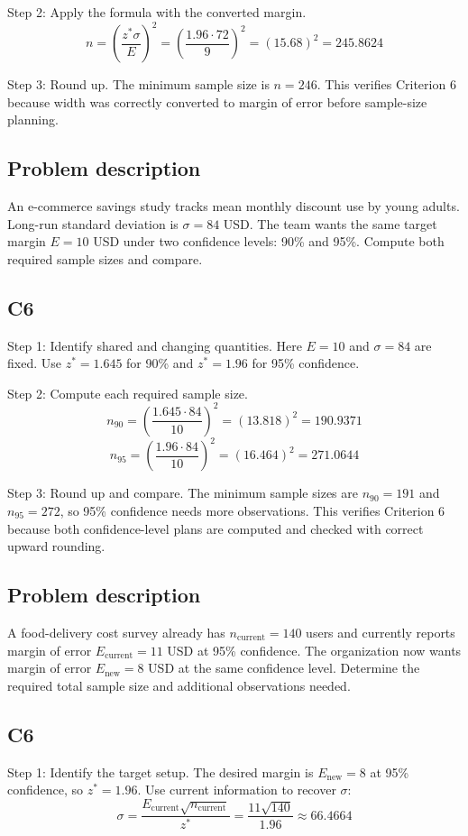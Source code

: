 \begin{ExamProblems}
		Step 2: Apply the formula with the converted margin.
		\[
		n = \left(\frac{z^*\sigma}{E}\right)^2
		= \left(\frac{1.96 \cdot 72}{9}\right)^2
		= \left(15.68\right)^2
		= 245.8624
		\]

		Step 3: Round up. The minimum sample size is $n = 246$. This verifies Criterion 6 because width was correctly converted to margin of error before sample-size planning.

		\item
		\subsection*{Problem description}
		An e-commerce savings study tracks mean monthly discount use by young adults. Long-run standard deviation is $\sigma = 84$ USD. The team wants the same target margin $E = 10$ USD under two confidence levels: 90\% and 95\%. Compute both required sample sizes and compare.

		\subsection*{C6}
		Step 1: Identify shared and changing quantities. Here $E = 10$ and $\sigma = 84$ are fixed. Use $z^* = 1.645$ for 90\% and $z^* = 1.96$ for 95\% confidence.

		Step 2: Compute each required sample size.
		\[
		n_{90} = \left(\frac{1.645 \cdot 84}{10}\right)^2
		= \left(13.818\right)^2
		= 190.9371
		\]
		\[
		n_{95} = \left(\frac{1.96 \cdot 84}{10}\right)^2
		= \left(16.464\right)^2
		= 271.0644
		\]

		Step 3: Round up and compare. The minimum sample sizes are $n_{90} = 191$ and $n_{95} = 272$, so 95\% confidence needs more observations. This verifies Criterion 6 because both confidence-level plans are computed and checked with correct upward rounding.

		\item
		\subsection*{Problem description}
		A food-delivery cost survey already has $n_{\text{current}} = 140$ users and currently reports margin of error $E_{\text{current}} = 11$ USD at 95\% confidence. The organization now wants margin of error $E_{\text{new}} = 8$ USD at the same confidence level. Determine the required total sample size and additional observations needed.

		\subsection*{C6}
		Step 1: Identify the target setup. The desired margin is $E_{\text{new}} = 8$ at 95\% confidence, so $z^* = 1.96$. Use current information to recover $\sigma$:
		\[
		\sigma = \frac{E_{\text{current}}\sqrt{n_{\text{current}}}}{z^*}
		= \frac{11\sqrt{140}}{1.96}
		\approx 66.4664
		\]


\end{ExamProblems}
